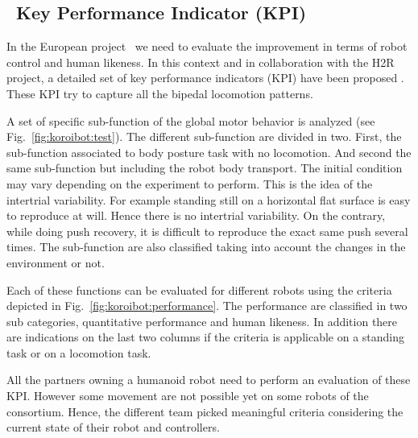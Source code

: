 \subsection*{\koroibot\ Key Performance Indicator (KPI)}

In the European project \koroibot\ we need to evaluate the improvement in terms of robot control and human likeness.
In this context and in collaboration with the H2R project, a detailed set of key performance indicators (KPI) have been proposed \cite{torricelli2015benchmarking}.
These KPI try to capture all the bipedal locomotion patterns.

A set of specific sub-function of the global motor behavior is analyzed (see Fig.~\ref{fig:koroibot:test}).
The different sub-function are divided in two.
First, the sub-function associated to body posture task with no locomotion.
And second the same sub-function but including the robot body transport.
The initial condition may vary depending on the experiment to perform.
This is the idea of the intertrial variability.
For example standing still on a horizontal flat surface is easy to reproduce at will.
Hence there is no intertrial variability.
On the contrary, while doing push recovery, it is difficult to reproduce the exact same push several times.
The sub-function are also classified taking into account the changes in the environment or not.

Each of these functions can be evaluated for different robots using the criteria depicted in Fig.~\ref{fig:koroibot:performance}.
The performance are classified in two sub categories, quantitative performance and human likeness.
In addition there are indications on the last two columns if the criteria is applicable on a standing task or on a locomotion task.

All the partners owning a humanoid robot need to perform an evaluation of these KPI.
However some movement are not possible yet on some robots of the consortium.
Hence, the different team picked meaningful criteria considering the current state of their robot and controllers.

